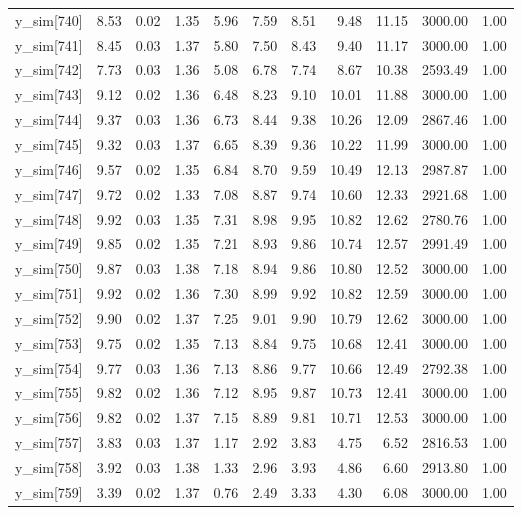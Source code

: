 \begin{table}[ht]
\begin{tabular}{rrrrrrrrrrr}
  y\_sim[740] & 8.53 & 0.02 & 1.35 & 5.96 & 7.59 & 8.51 & 9.48 & 11.15 & 3000.00 & 1.00 \\ 
  y\_sim[741] & 8.45 & 0.03 & 1.37 & 5.80 & 7.50 & 8.43 & 9.40 & 11.17 & 3000.00 & 1.00 \\ 
  y\_sim[742] & 7.73 & 0.03 & 1.36 & 5.08 & 6.78 & 7.74 & 8.67 & 10.38 & 2593.49 & 1.00 \\ 
  y\_sim[743] & 9.12 & 0.02 & 1.36 & 6.48 & 8.23 & 9.10 & 10.01 & 11.88 & 3000.00 & 1.00 \\ 
  y\_sim[744] & 9.37 & 0.03 & 1.36 & 6.73 & 8.44 & 9.38 & 10.26 & 12.09 & 2867.46 & 1.00 \\ 
  y\_sim[745] & 9.32 & 0.03 & 1.37 & 6.65 & 8.39 & 9.36 & 10.22 & 11.99 & 3000.00 & 1.00 \\ 
  y\_sim[746] & 9.57 & 0.02 & 1.35 & 6.84 & 8.70 & 9.59 & 10.49 & 12.13 & 2987.87 & 1.00 \\ 
  y\_sim[747] & 9.72 & 0.02 & 1.33 & 7.08 & 8.87 & 9.74 & 10.60 & 12.33 & 2921.68 & 1.00 \\ 
  y\_sim[748] & 9.92 & 0.03 & 1.35 & 7.31 & 8.98 & 9.95 & 10.82 & 12.62 & 2780.76 & 1.00 \\ 
  y\_sim[749] & 9.85 & 0.02 & 1.35 & 7.21 & 8.93 & 9.86 & 10.74 & 12.57 & 2991.49 & 1.00 \\ 
  y\_sim[750] & 9.87 & 0.03 & 1.38 & 7.18 & 8.94 & 9.86 & 10.80 & 12.52 & 3000.00 & 1.00 \\ 
  y\_sim[751] & 9.92 & 0.02 & 1.36 & 7.30 & 8.99 & 9.92 & 10.82 & 12.59 & 3000.00 & 1.00 \\ 
  y\_sim[752] & 9.90 & 0.02 & 1.37 & 7.25 & 9.01 & 9.90 & 10.79 & 12.62 & 3000.00 & 1.00 \\ 
  y\_sim[753] & 9.75 & 0.02 & 1.35 & 7.13 & 8.84 & 9.75 & 10.68 & 12.41 & 3000.00 & 1.00 \\ 
  y\_sim[754] & 9.77 & 0.03 & 1.36 & 7.13 & 8.86 & 9.77 & 10.66 & 12.49 & 2792.38 & 1.00 \\ 
  y\_sim[755] & 9.82 & 0.02 & 1.36 & 7.12 & 8.95 & 9.87 & 10.73 & 12.41 & 3000.00 & 1.00 \\ 
  y\_sim[756] & 9.82 & 0.02 & 1.37 & 7.15 & 8.89 & 9.81 & 10.71 & 12.53 & 3000.00 & 1.00 \\ 
  y\_sim[757] & 3.83 & 0.03 & 1.37 & 1.17 & 2.92 & 3.83 & 4.75 & 6.52 & 2816.53 & 1.00 \\ 
  y\_sim[758] & 3.92 & 0.03 & 1.38 & 1.33 & 2.96 & 3.93 & 4.86 & 6.60 & 2913.80 & 1.00 \\ 
  y\_sim[759] & 3.39 & 0.02 & 1.37 & 0.76 & 2.49 & 3.33 & 4.30 & 6.08 & 3000.00 & 1.00 \\ 

\end{tabular}
\end{table}
